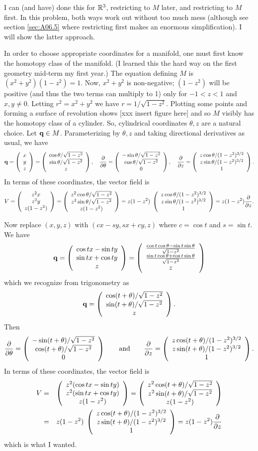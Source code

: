 \documentclass[10pt]{article}
\numberwithin{equation}{subsection}
\begin{document}
I can (and have) done this for $\mathbb{R}^3$, restricting to $M$ later, and
restricting to $M$ first.  In this problem, both ways work out without too much
mess (although see section \ref{sec:A06.5} where restricting first makes an
enormous simplification).  I will show the latter approach.

In order to choose appropriate coordinates for a manifold, one must first know
the homotopy class of the manifold.  (I learned this the hard way on the first
geometry mid-term my first year.)  The equation defining $M$ is
$(x^2+y^2)(1-z^2)=1$.  Now, $x^2+y^2$ is non-negative; $(1-z^2)$ will be
positive (and thus the two terms can multiply to 1) only for $-1 < z < 1$ and
$x,y\ne 0$.  Letting $r^2=x^2+y^2$ we have $r = 1/\sqrt{1-z^2}$.  Plotting some
points and forming a surface of revolution shows [xxx insert figure here] and
so $M$ visibly has the homotopy class of a cylinder.  So, cylindrical
coordinates $\theta,z$ are a natural choice.  Let $\mathbf{q} \in M$.
Parameterizing by $\theta,z$ and taking directional derivatives as usual, we
have
$$
	\mathbf{q} = \left(\begin{array}{c} x \\ y \\ z\end{array}\right)
		= \left(\begin{array}{c} \cos\theta/\sqrt{1-z^2} \\ \sin\theta/\sqrt{1-z^2} \\ z\end{array}\right), \quad
	\frac{\partial}{\partial \theta} = \left(\begin{array}{c} -\sin\theta/\sqrt{1-z^2} \\ \cos\theta/\sqrt{1-z^2} \\ 0\end{array}\right), \quad
	\frac{\partial}{\partial z} = \left(\begin{array}{c} z\cos\theta/(1-z^2)^{3/2} \\ z\sin\theta/(1-z^2)^{3/2} \\ 1\end{array}\right).
$$
In terms of these coordinates, the vector field is
$$
	V = \left(\begin{array}{c} z^2x \\ z^2y \\ z(1-z^2)\end{array}\right)
	= \left(\begin{array}{c} z^2\cos\theta/\sqrt{1-z^2} \\ z^2\sin\theta/\sqrt{1-z^2} \\ z(1-z^2)\end{array}\right)
	= z(1-z^2)\; \left(\begin{array}{c} z\cos\theta/(1-z^2)^{3/2} \\ z\sin\theta/(1-z^2)^{3/2} \\ 1\end{array}\right)
	= z(1-z^2)\frac{\partial}{\partial z}.
$$

Now replace $(x,y,z)$ with $(cx-sy,sx+cy,z)$ where $c=\cos t$ and $s=\sin t$.
We have
$$
	\mathbf{q} = \left(\begin{array}{c} \cos t x - \sin t y \\ \sin t x + \cos t y \\ z\end{array}\right)
		= \left(\begin{array}{c} \frac{\cos t \cos\theta - \sin t \sin \theta}{\sqrt{1-z^2}} \\ \frac{\sin t \cos\theta + \cos t \sin\theta}{\sqrt{1-z^2}} \\ z\end{array}\right)
$$
which we recognize from trigonometry as
$$
	\mathbf{q} = \left(\begin{array}{c} \cos(t+\theta)/\sqrt{1-z^2} \\ \sin(t+\theta)/\sqrt{1-z^2} \\ z\end{array}\right).
$$
Then
$$
	\frac{\partial}{\partial \theta} = \left(\begin{array}{c} -\sin(t+\theta)/\sqrt{1-z^2} \\ \cos(t+\theta)/\sqrt{1-z^2} \\ 0\end{array}\right) \qquad\textrm{and}\qquad
	\frac{\partial}{\partial z} = \left(\begin{array}{c} z\cos(t+\theta)/(1-z^2)^{3/2} \\ z\sin(t+\theta)/(1-z^2)^{3/2} \\ 1\end{array}\right).
$$
In terms of these coordinates, the vector field is
\begin{eqnarray*}
	V &=& \left(\begin{array}{c} z^2(\cos t x - \sin t y) \\ z^2(\sin t x + \cos t y) \\ z(1-z^2)\end{array}\right)
	= \left(\begin{array}{c} z^2\cos(t+\theta)/\sqrt{1-z^2} \\ z^2\sin(t+\theta)/\sqrt{1-z^2} \\ z(1-z^2)\end{array}\right) \\
	&=& z(1-z^2)\; \left(\begin{array}{c} z\cos(t+\theta)/(1-z^2)^{3/2} \\ z\sin(t+\theta)/(1-z^2)^{3/2} \\ 1\end{array}\right)
	= z(1-z^2)\frac{\partial}{\partial z}
\end{eqnarray*}
which is what I wanted.
\end{document}
